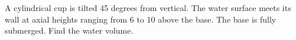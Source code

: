 A cylindrical cup is tilted 45 degrees from vertical. The water surface meets its wall at axial heights ranging from 6 to 10 above the base. The base is fully submerged. Find the water volume.
